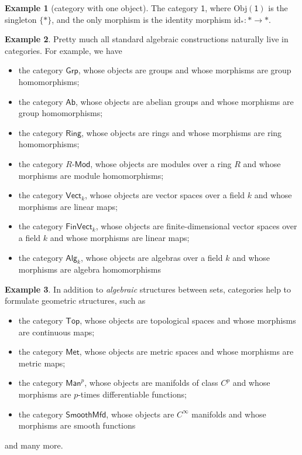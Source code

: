 \documentclass[a4paper]{report}
\newcommand{\Obj}{\mathrm{Obj}}
\theoremstyle{definition}
\newtheorem{example}{Example}[section]
\theoremstyle{plain}
\theoremstyle{remark}
\begin{document}
\begin{example}[category with one object]
  \label{eg:categorywithoneobject}
  The category $\mathsf{1}$, where $\Obj(\mathsf{1})$ is the singleton $\{*\}$, and the only morphism is the identity morphism $\mathrm{id}_{*}\colon * \to *$.
\end{example}
\begin{example}
  \label{eg:examplesofcategories}
  Pretty much all standard algebraic constructions naturally live in categories. For example, we have 
  \begin{itemize} 
    \item the category $\mathsf{Grp}$, whose objects are groups and whose morphisms are group homomorphisms;

    \item \label{item:categoryab} the category $\mathsf{Ab}$, whose objects are abelian groups and whose morphisms are group homomorphisms;

    \item the category $\mathsf{Ring}$, whose objects are rings and whose morphisms are ring homomorphisms;

    \item the category $R\text{-}\mathsf{Mod}$, whose objects are modules over a ring $R$ and whose morphisms are module homomorphisms;

    \item the category $\mathsf{Vect}_{k}$, whose objects are vector spaces over a field $k$ and whose morphisms are linear maps;
    \item the category $\mathsf{FinVect}_{k}$, whose objects are finite-dimensional vector spaces over a field $k$ and whose morphisms are linear maps;
    \item the category $\mathsf{Alg}_{k}$, whose objects are algebras over a field $k$ and whose morphisms are algebra homomorphisms
  \end{itemize}
\end{example}

\begin{example}
  \label{eg:moreexamplesofcategories}
  In addition to \emph{algebraic} structures between sets, categories help to formulate geometric structures, such as
  \begin{itemize}
    \item the category $\mathsf{Top}$, whose objects are topological spaces and whose morphisms are continuous maps;
    \item the category $\mathsf{Met}$, whose objects are metric spaces and whose morphisms are metric maps;
    \item the category $\mathsf{Man}^{p}$, whose objects are manifolds of class $C^{p}$ and whose morphisms are $p$-times differentiable functions;

    \item the category $\mathsf{SmoothMfd}$, whose objects are $C^{\infty}$ manifolds and whose morphisms are smooth functions
  \end{itemize}
  and many more.
\end{example}
\end{document}
